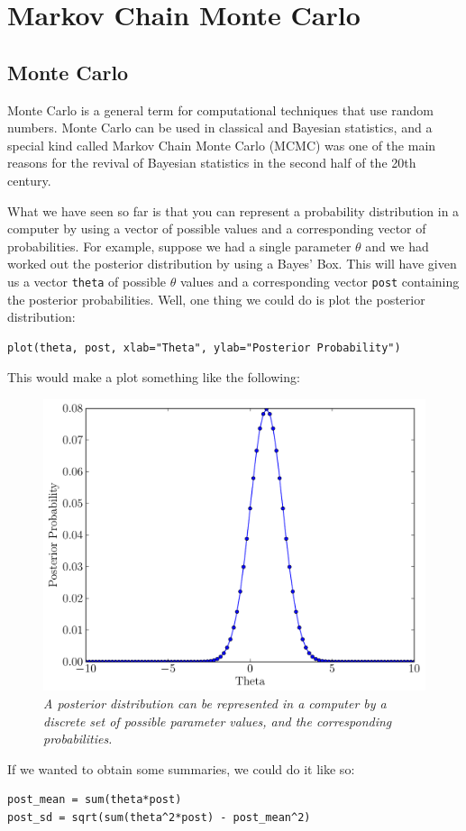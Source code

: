 \chapter{Markov Chain Monte Carlo}
\section{Monte Carlo}
Monte Carlo is a general term for computational techniques that use random
numbers.
Monte Carlo can be used in classical and Bayesian statistics, and a special kind
called Markov Chain Monte Carlo (MCMC) was one of the main reasons
for the revival of Bayesian statistics in the second half of the 20th century.

What we have seen so far is that you can represent a probability distribution
in a computer by using a vector of possible values and a corresponding
vector of probabilities. For example, suppose we had a single parameter $\theta$
and we had worked out the posterior distribution by using a Bayes' Box. This
will have given us a vector {\tt theta} of possible $\theta$ values and a corresponding
vector {\tt post} containing the posterior probabilities. Well, one thing we could
do is plot the posterior distribution:
\begin{verbatim}
plot(theta, post, xlab="Theta", ylab="Posterior Probability")
\end{verbatim}
This would make a plot something like the following:

\begin{figure}[ht!]
\begin{center}
\includegraphics[scale=0.5]{Figures/normal.pdf}
\caption{\it A posterior distribution can be represented in a computer by a discrete
set of possible parameter values, and the corresponding probabilities.\label{fig:normal}}
\end{center}
\end{figure}
If we wanted to obtain some summaries, we could do it like so:
\begin{verbatim}
post_mean = sum(theta*post)
post_sd = sqrt(sum(theta^2*post) - post_mean^2)
\end{verbatim}

